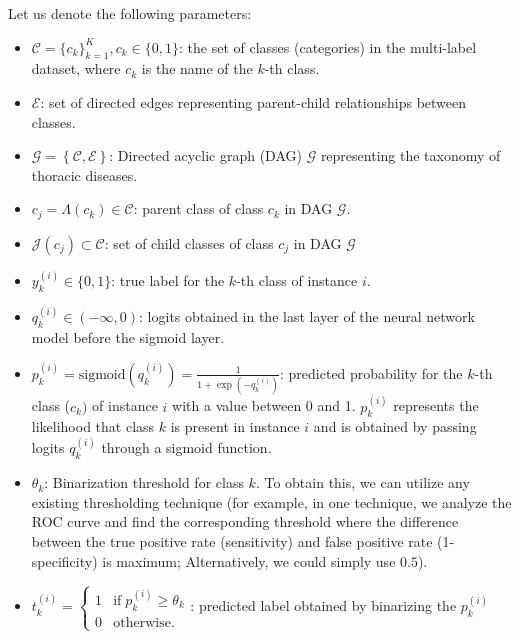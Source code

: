 Let us denote the following parameters:
\begin{itemize}
    \item  $\mathcal{C} = {\{c_k\}}_{k=1}^{K} , c_k \in \{0,1\} $: the set of classes (categories) in the multi-label dataset, where $c_k $ is the name of the $k $-th class.

    \item  $\mathcal{E} $: set of directed edges representing parent-child relationships between classes.

    \item  $\mathcal{G}=\left\{\mathcal{C},\mathcal{E}\right\} $: Directed acyclic graph (DAG) $\mathcal{G} $ representing the taxonomy of thoracic diseases.

    \item  $c_j=\Lambda (c_k) \in \mathcal{C}$: parent class of class $c_k $ in DAG $\mathcal{G} $.

    \item  $\mathcal{J}(c_j) \subset \mathcal{C}$: set of child classes of class $c_j$ in DAG $\mathcal{G} $

    \item  $y_k^{(i)} \in \{0,1\} $: true label for the $k $-th class of instance $i $.

    \item  $q_k^{(i)} \in \left( -\infty,0 \right) $: logits obtained in the last layer of the neural network model before the sigmoid layer.

    \item  $p_k^{(i)} = \text{sigmoid}\left(q_k^{(i)}\right) = \frac{1}{1+\exp{\left(-q_k^{(i)}\right)}} $: predicted probability for the $k $-th class ($c_k) $ of instance $i $ with a value between 0 and 1. $p_k^{(i)} $ represents the likelihood that class $k $ is present in instance $i $ and is obtained by passing logits $q_k^{(i)} $ through a sigmoid function.

    \item  $\theta_k $: Binarization threshold for class $k $.  To obtain this, we can utilize any existing thresholding technique (for example, in one technique, we analyze the ROC curve and find the corresponding threshold where the difference between the true positive rate (sensitivity) and false positive rate (1-specificity) is maximum; Alternatively, we could simply use $0.5 $).

    \item  $t_k^{(i)}=\left\{\begin{array}{lc}1&\text{if}\;p_k^{(i)} \geq \theta_k\\0&\text{otherwise.}\end{array}\right. $: predicted label obtained by binarizing the $p_k^{(i)} $


\end{itemize}
